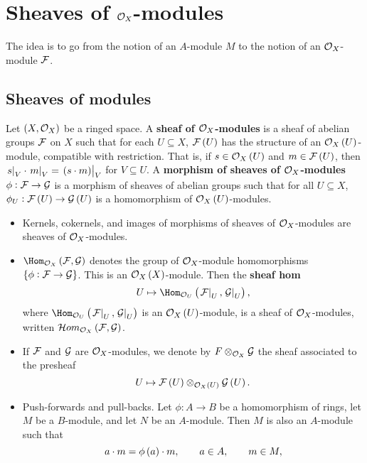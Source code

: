 \pagebreak

\section{Sheaves of \texorpdfstring{$ \mathcal{O}_X $-modules}{modules}}

The idea is to go from the notion of an $ A $-module $ M $ to the notion of an $ \mathcal{O}_X $-module $ \mathcal{F} $.

\subsection{Sheaves of modules}

\begin{definition*}
Let $ \br{X, \OOO_X} $ be a ringed space. A \textbf{sheaf of $ \mathcal{O}_X $-modules} is a sheaf of abelian groups $ \mathcal{F} $ on $ X $ such that for each $ U \subseteq X $, $ \FFF\br{U} $ has the structure of an $ \OOO_X\br{U} $-module, compatible with restriction. That is, if $ s \in \OOO_X\br{U} $ and $ m \in \FFF\br{U} $, then $ \eval{s}_V \cdot \eval{m}_V = \eval{\br{s \cdot m}}_V $ for $ V \subseteq U $. A \textbf{morphism of sheaves of $ \mathcal{O}_X $-modules} $ \phi : \mathcal{F} \to \mathcal{G} $ is a morphism of sheaves of abelian groups such that for all $ U \subseteq X $, $ \phi_U : \FFF\br{U} \to \GGG\br{U} $ is a homomorphism of $ \OOO_X\br{U} $-modules.
\begin{itemize}
\item Kernels, cokernels, and images of morphisms of sheaves of $ \mathcal{O}_X $-modules are sheaves of $ \mathcal{O}_X $-modules.
\item $ \Hom_{\OOO_X}\br{\FFF, \GGG} $ denotes the group of $ \mathcal{O}_X $-module homomorphisms $ \cbr{\phi : \FFF \to \GGG} $. This is an $ \OOO_X\br{X} $-module. Then the \textbf{sheaf hom}
$$ U \mapsto \Hom_{\OOO_U}\br{\eval{\FFF}_U, \eval{\GGG}_U}, $$
where $ \Hom_{\OOO_U}\br{\eval{\FFF}_U, \eval{\GGG}_U} $ is an $ \OOO_X\br{U} $-module, is a sheaf of $ \mathcal{O}_X $-modules, written $ \HOM_{\OOO_X}\br{\FFF, \GGG} $.
\item If $ \mathcal{F} $ and $ \mathcal{G} $ are $ \mathcal{O}_X $-modules, we denote by $ F \otimes_{\mathcal{O}_X} \mathcal{G} $ the sheaf associated to the presheaf
$$ U \mapsto \FFF\br{U} \otimes_{\OOO_X\br{U}} \GGG\br{U}. $$
\item Push-forwards and pull-backs. Let $ \phi : A \to B $ be a homomorphism of rings, let $ M $ be a $ B $-module, and let $ N $ be an $ A $-module. Then $ M $ is also an $ A $-module such that
$$ a \cdot m = \phi\br{a} \cdot m, \qquad a \in A, \qquad m \in M, $$

\end{itemize}
\end{definition*}
